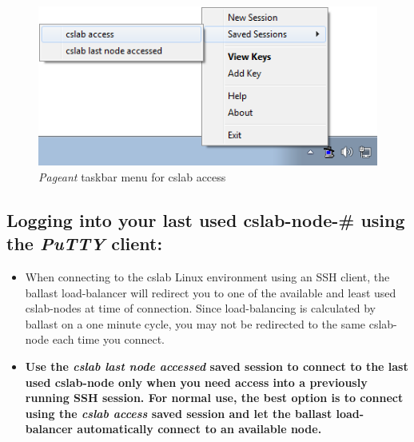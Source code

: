 \documentclass[12pt]{article}
\begin{document}
\begin{flushleft}
\begin{figure}[bh!]
  \centering
  \centering
  \includegraphics[width=.5\linewidth]{pageant_taskbar_menu}
\caption{\textit{Pageant} taskbar menu for cslab access}
  \label{fig:pageant}
\end{figure}

\newpage
\subsection*{Logging into your last used cslab-node-\# using the \textit{PuTTY} client:}
\begin{itemize}
  \item When connecting to the cslab Linux environment using an SSH client, the ballast load-balancer will redirect you to one of the available and least used cslab-nodes at time of connection. Since load-balancing is calculated by ballast on a one minute cycle, you may not be redirected to the same cslab-node each time you connect.

  \item \textbf{Use the \textit{cslab last node accessed} saved session to connect to the last used cslab-node only when you need access into a previously running SSH session. For normal use, the best option is to connect using the \textit{cslab access} saved session and let the ballast load-balancer automatically connect to an available node.}
\end{itemize}


\end{flushleft}
\end{document}
